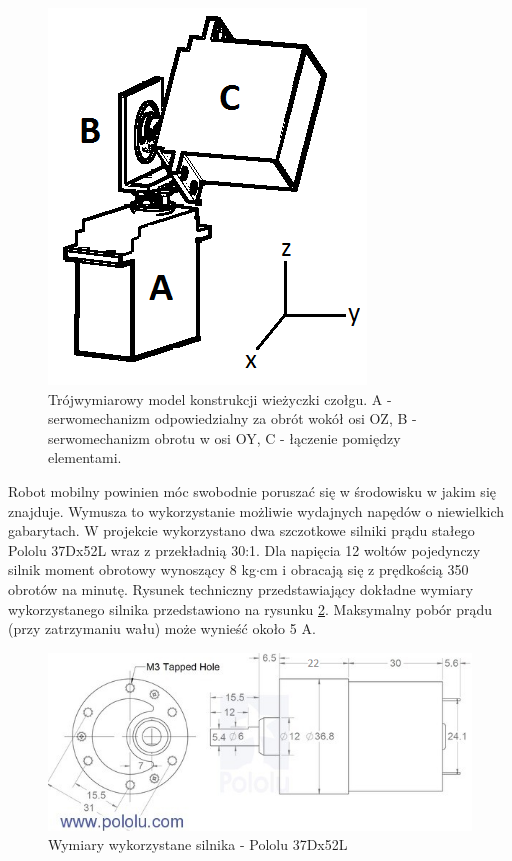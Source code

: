   \begin{figure}[H]
    \begin{center}
      \includegraphics[scale=0.45]{imgs/wieza_3d.png}
 	\caption[Model wieżyczki.]{\small{Trójwymiarowy model konstrukcji wieżyczki czołgu. A - serwomechanizm odpowiedzialny za obrót wokół osi OZ, B - serwomechanizm obrotu w osi OY, C - łączenie pomiędzy elementami.}}
	\label{wieza3d}
    \end{center}
  \end{figure}
Robot mobilny powinien móc swobodnie poruszać się w środowisku w jakim się znajduje. Wymusza to wykorzystanie możliwie wydajnych napędów o niewielkich gabarytach. W projekcie wykorzystano dwa szczotkowe silniki prądu stałego Pololu 37Dx52L wraz z przekładnią 30:1. Dla napięcia 12 woltów pojedynczy silnik moment obrotowy wynoszący 8 kg$\cdot$cm i obracają się z prędkością 350 obrotów na minutę. Rysunek techniczny przedstawiający dokładne wymiary wykorzystanego silnika przedstawiono na rysunku \ref{wymiary_silnika}. Maksymalny pobór prądu (przy zatrzymaniu wału) może wynieść około 5 A.

  \begin{figure}[H]
    \begin{center}
      \includegraphics[scale=0.7]{imgs/silnik_wymiary.png}
 	\caption[Wymiary silnika Pololu 37Dx52L ]{\small{Wymiary wykorzystane silnika - Pololu 37Dx52L }\footnotemark}
	\label{wymiary_silnika}
    \end{center}
  \end{figure}

